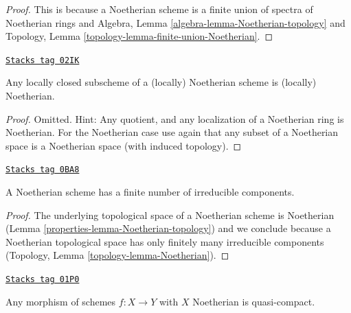 \begin{proof}
This is because a Noetherian scheme is a finite union of spectra
of Noetherian rings and
Algebra, Lemma \ref{algebra-lemma-Noetherian-topology} and
Topology, Lemma \ref{topology-lemma-finite-union-Noetherian}.
\end{proof}

\begin{lemma}
\label{properties-lemma-locally-closed-in-Noetherian}
\href{https://stacks.math.columbia.edu/tag/02IK}{\texttt{Stacks tag 02IK}}

Any locally closed subscheme of a (locally) Noetherian
scheme is (locally) Noetherian.
\end{lemma}

\begin{proof}
Omitted. Hint: Any quotient, and any localization of a Noetherian
ring is Noetherian. For the Noetherian case use again
that any subset of a Noetherian space is a Noetherian space
(with induced topology).
\end{proof}

\begin{lemma}
\label{properties-lemma-Noetherian-irreducible-components}
\href{https://stacks.math.columbia.edu/tag/0BA8}{\texttt{Stacks tag 0BA8}}

A Noetherian scheme has a finite number of irreducible components.
\end{lemma}

\begin{proof}

The underlying topological space of a Noetherian scheme is Noetherian
(Lemma \ref{properties-lemma-Noetherian-topology})
and we conclude because a Noetherian topological space
has only finitely many irreducible components
(Topology, Lemma \ref{topology-lemma-Noetherian}).
\end{proof}

\begin{lemma}
\label{properties-lemma-morphism-Noetherian-schemes-quasi-compact}
\href{https://stacks.math.columbia.edu/tag/01P0}{\texttt{Stacks tag 01P0}}

Any morphism of schemes $f : X \to Y$ with $X$ Noetherian
is quasi-compact.
\end{lemma}


